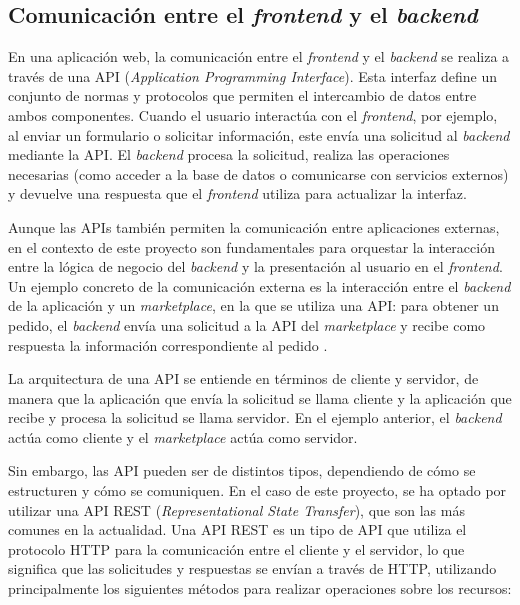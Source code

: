 \subsection{Comunicación entre el \textit{frontend} y el \textit{backend}}
\label{mt:subsec:api}

En una aplicación web, la comunicación entre el \textit{frontend} y el \textit{backend} se realiza a través de una API (\textit{Application Programming Interface}). Esta interfaz define un conjunto de normas y protocolos que permiten el intercambio de datos entre ambos componentes. Cuando el usuario interactúa con el \textit{frontend}, por ejemplo, al enviar un formulario o solicitar información, este envía una solicitud al \textit{backend} mediante la API. El \textit{backend} procesa la solicitud, realiza las operaciones necesarias (como acceder a la base de datos o comunicarse con servicios externos) y devuelve una respuesta que el \textit{frontend} utiliza para actualizar la interfaz.

Aunque las APIs también permiten la comunicación entre aplicaciones externas, en el contexto de este proyecto son fundamentales para orquestar la interacción entre la lógica de negocio del \textit{backend} y la presentación al usuario en el \textit{frontend}. Un ejemplo concreto de la comunicación externa es la interacción entre el \textit{backend} de la aplicación y un \textit{marketplace}, en la que se utiliza una API: para obtener un pedido, el \textit{backend} envía una solicitud a la API del \textit{marketplace} y recibe como respuesta la información correspondiente al pedido \cite{aws_api}.

La arquitectura de una API se entiende en términos de cliente y servidor, de manera que la aplicación que envía la solicitud se llama cliente y la aplicación que recibe y procesa la solicitud se llama servidor. En el ejemplo anterior, el \textit{backend} actúa como cliente y el \textit{marketplace} actúa como servidor.

Sin embargo, las API pueden ser de distintos tipos, dependiendo de cómo se estructuren y cómo se comuniquen. En el caso de este proyecto, se ha optado por utilizar una API REST (\textit{Representational State Transfer}), que son las más comunes en la actualidad. Una API REST es un tipo de API que utiliza el protocolo HTTP para la comunicación entre el cliente y el servidor, lo que significa que las solicitudes y respuestas se envían a través de HTTP, utilizando principalmente los siguientes métodos para realizar operaciones sobre los recursos:

